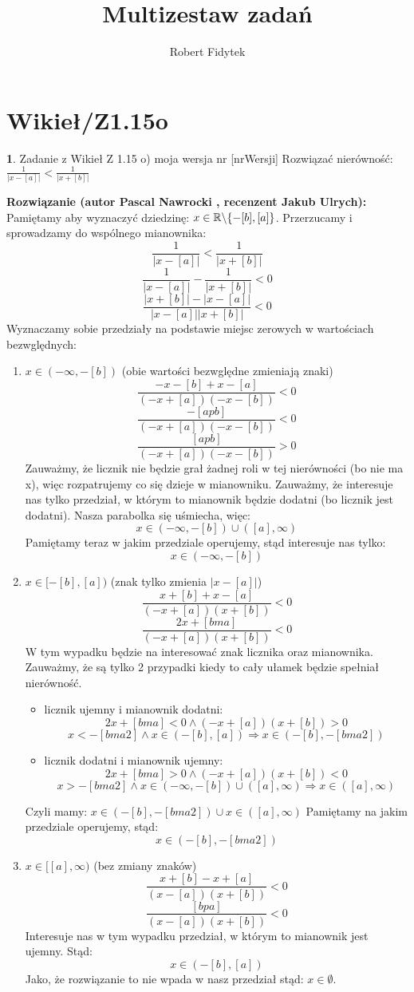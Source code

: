 \documentclass[12pt, a4paper]{article}
\title{Multizestaw zadań}
\author{Robert Fidytek}
\date{}
\theoremstyle{definition} %
\newtheorem{zad}{}
\newcommand{\kategoria}[1]{\section{#1}} %
\newcommand{\zadStart}[1]{\begin{zad}#1\newline} %
\newcommand{\zadStop}{\end{zad}}   %
\newcommand{\rozwStart}[2]{\noindent \textbf{Rozwiązanie (autor #1 , recenzent #2): }\newline} %
\begin{document}
\maketitle


\kategoria{Wikieł/Z1.15o}
\zadStart{Zadanie z Wikieł Z 1.15 o) moja wersja nr [nrWersji]}
Rozwiązać nierówność: $\frac{1}{|x-[a]|}<\frac{1}{|x+[b]|}$
\zadStop
\rozwStart{Pascal Nawrocki}{Jakub Ulrych}
Pamiętamy aby wyznaczyć dziedzinę: $x\in\mathbb{R}\symbol{92}\{-[b],[a]\}$.
Przerzucamy i sprowadzamy do wspólnego mianownika:
$$\frac{1}{|x-[a]|}<\frac{1}{|x+[b]|}$$
\newline
$$\frac{1}{|x-[a]|}-\frac{1}{|x+[b]|}<0$$
\newline
$$\frac{|x+[b]|-|x-[a]|}{|x-[a]||x+[b]|}<0$$
Wyznaczamy sobie przedziały na podstawie miejsc zerowych w wartościach bezwględnych:
\begin{enumerate}
\item $x\in(-\infty,-[b])$ (obie wartości bezwględne zmieniają znaki)
$$\frac{-x-[b]+x-[a]}{(-x+[a])(-x-[b])}<0$$
$$\frac{-[apb]}{(-x+[a])(-x-[b])}<0$$
$$\frac{[apb]}{(-x+[a])(-x-[b])}>0$$
Zauważmy, że licznik nie będzie grał żadnej roli w tej nierówności (bo nie ma x), więc rozpatrujemy co się dzieje w mianowniku. Zauważmy, że interesuje nas tylko przedział, w którym to mianownik będzie dodatni (bo licznik jest dodatni). Nasza parabolka się uśmiecha, więc:
$$x\in(-\infty,-[b])\cup([a],\infty)$$
Pamiętamy teraz w jakim przedziale operujemy, stąd interesuje nas tylko:
$$x\in(-\infty,-[b])$$
\item $x\in[-[b],[a])$ (znak tylko zmienia $|x-[a]|$)
$$\frac{x+[b]+x-[a]}{(-x+[a])(x+[b])}<0$$
$$\frac{2x+[bma]}{(-x+[a])(x+[b])}<0$$
W tym wypadku będzie na interesować znak licznika oraz mianownika. Zauważmy, że są tylko 2 przypadki kiedy to cały ułamek będzie spełniał nierówność.
\begin{itemize}
\item licznik ujemny i mianownik dodatni:
$$2x+[bma]<0 \wedge (-x+[a])(x+[b])>0$$
$$x<-[bma2] \wedge x\in(-[b],[a])\Rightarrow x\in(-[b],-[bma2])$$
\item licznik dodatni i mianownik ujemny:
$$2x+[bma]>0 \wedge (-x+[a])(x+[b])<0$$
$$x>-[bma2] \wedge x\in(-\infty,-[b])\cup([a],\infty)\Rightarrow x\in([a],\infty)$$
\end{itemize}
Czyli mamy: $x\in(-[b],-[bma2])\cup x\in([a],\infty)$
Pamiętamy na jakim przedziale operujemy, stąd:
$$x\in(-[b],-[bma2])$$
\item $x\in[[a],\infty)$ (bez zmiany znaków)
$$\frac{x+[b]-x+[a]}{(x-[a])(x+[b])}<0$$
$$\frac{[bpa]}{(x-[a])(x+[b])}<0$$
Interesuje nas w tym wypadku przedział, w którym to mianownik jest ujemny. Stąd:
$$x\in(-[b],[a])$$
Jako, że rozwiązanie to nie wpada w nasz przedział stąd: $x\in\emptyset$.
\end{enumerate}
\end{document}
